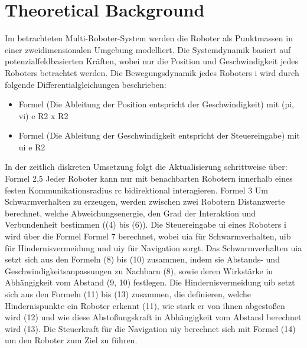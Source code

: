 \documentclass[conference]{IEEEtran}
\begin{document}
\section{Theoretical Background}
Im betrachteten Multi-Roboter-System werden die Roboter als Punktmassen in einer zweidimensionalen Umgebung modelliert. Die Systemdynamik basiert auf potenzialfeldbasierten Kräften, wobei nur die Position und Geschwindigkeit jedes Roboters betrachtet werden. Die Bewegungsdynamik jedes Roboters i wird durch folgende Differentialgleichungen beschrieben:
\begin{itemize}
    \item Formel (Die Ableitung der Position entspricht der Geschwindigkeit) mit (pi, vi) e R2 x R2
    \item Formel (Die Ableitung der Geschwindigkeit entspricht der Steuereingabe) mit ui e R2
\end{itemize}
In der zeitlich diskreten Umsetzung folgt die Aktualisierung schrittweise über:
Formel 2,5
Jeder Roboter kann nur mit benachbarten Robotern innerhalb eines festen Kommunikationsradius rc bidirektional interagieren.
Formel 3
Um Schwarmverhalten zu erzeugen, werden zwischen zwei Robotern Distanzwerte berechnet, welche Abweichungsenergie, den Grad der Interaktion und Verbundenheit bestimmen ((4) bis (6)).
Die Steuereingabe ui eines Roboters i wird über die Formel
Formel 7
berechnet, wobei uia für Schwarmverhalten, uib für Hindernisvermeidung und uiy für Navigation sorgt. Das Schwarmverhalten uia setzt sich aus den Formeln (8) bis (10) zusammen, indem sie Abstands- und Geschwindigkeitsanpassungen zu Nachbarn (8), sowie deren Wirkstärke in Abhängigkeit vom Abstand (9, 10) festlegen. Die Hindernisvermeidung uib setzt sich aus den Formeln (11) bis (13) zusammen, die definieren, welche Hindernispunkte ein Roboter erkennt (11), wie stark er von ihnen abgestoßen wird (12) und wie diese Abstoßungskraft in Abhängigkeit vom Abstand berechnet wird (13). Die Steuerkraft für die Navigation uiy berechnet sich mit Formel (14) um den Roboter zum Ziel zu führen.
\end{document}
